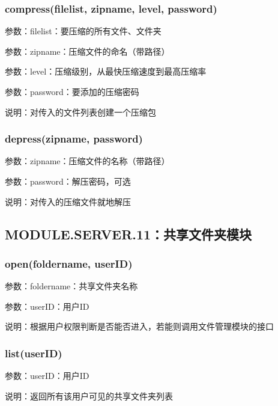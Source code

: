 \subsubsection{compress(filelist, zipname, level, password)}

参数：filelist：要压缩的所有文件、文件夹

参数：zipname：压缩文件的命名（带路径）

参数：level：压缩级别，从最快压缩速度到最高压缩率

参数：password：要添加的压缩密码

说明：对传入的文件列表创建一个压缩包

\subsubsection{depress(zipname, password)}
参数：zipname：压缩文件的名称（带路径）

参数：password：解压密码，可选

说明：对传入的压缩文件就地解压

\subsection{MODULE.SERVER.11：共享文件夹模块}
\subsubsection{open(foldername, userID)}
参数：foldername：共享文件夹名称

参数：userID：用户ID

说明：根据用户权限判断是否能否进入，若能则调用文件管理模块的接口
 
\subsubsection{list(userID)}
参数：userID：用户ID

说明：返回所有该用户可见的共享文件夹列表


